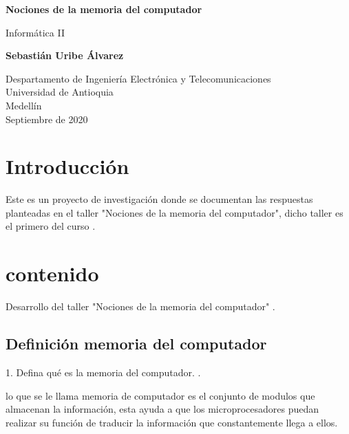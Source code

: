 \documentclass{article}
\begin{document}
\begin{titlepage}
    \begin{center}
        \vspace*{1cm}
            
        \Huge
        \textbf{Nociones de la memoria del computador}
            
        \vspace{0.5cm}
        \LARGE
        Informática II
            
        \vspace{1.5cm}
            
        \textbf{Sebastián Uribe Álvarez}
            
        \vfill
            
        \vspace{0.8cm}
            
        \Large
        Despartamento de Ingeniería Electrónica y Telecomunicaciones\\
        Universidad de Antioquia\\
        Medellín\\
        Septiembre de 2020
            
    \end{center}
\end{titlepage}

\tableofcontents

\section{Introducción}\label{Introducción}
Este es un proyecto de investigación donde se documentan las respuestas planteadas en el taller "Nociones de la memoria del computador", dicho taller es el primero del curso .

\section{contenido} \label{contenido}

Desarrollo del taller "Nociones de la memoria del computador"
. \cite{refer}


\subsection{Definición memoria del computador}\label{memo}

1. Defina qué es la memoria del computador.
. \cite{refer}

lo que se le llama memoria de computador 
es el conjunto de modulos que almacenan 
la información, esta ayuda a que los microprocesadores puedan realizar su función de traducir la información que constantemente llega a ellos.
\end{document}

